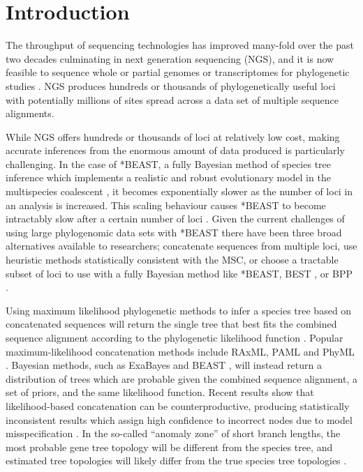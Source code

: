 \documentclass[nogrid]{MBE}%
\begin{document}

\maketitle
\clearpage

\section{Introduction}

The throughput of sequencing technologies has improved many-fold over the past
two decades culminating in next generation sequencing (NGS), and it is now
feasible to sequence whole or partial genomes or transcriptomes for phylogenetic
studies \citep{annurev-ecolsys-110512-135822}. NGS produces hundreds or
thousands of phylogenetically useful loci \citep[see for example][]{Blom20160181}
with potentially millions of sites spread across a data set of multiple
sequence alignments.

While NGS offers hundreds or thousands of loci at relatively low cost, making
accurate inferences from the enormous amount of data produced is particularly
challenging. In the case of *BEAST, a fully Bayesian method of species tree
inference which implements a realistic and robust evolutionary model in the
multispecies coalescent \citep[MSC;][]{Degnan2009332, Heled01032010}, it becomes exponentially
slower as the number of loci in an analysis is increased. This scaling behaviour
causes *BEAST to become intractably slow after a certain number of loci
\citep[the exact number will depend on other parameters of the data set, see][]{Ogilvie01052016}.
Given the current challenges of using large phylogenomic data sets with *BEAST
there have been three broad alternatives available to researchers; concatenate
sequences from multiple loci, use heuristic methods statistically consistent with the MSC, or choose a tractable
subset of loci to use with a fully Bayesian method like *BEAST, BEST \citep{Liu01112008}, or BPP
\citep{Yang854}.

Using maximum likelihood phylogenetic methods to infer a species tree based on concatenated
sequences will return the single tree that
best fits the combined sequence alignment according to the phylogenetic likelihood function \citep{Felsenstein1981}. Popular maximum-likelihood concatenation methods include
RAxML, PAML and PhyML \citep{Stamatakis01052014,
Yang01082007,Guindon01052010}. Bayesian methods, such as ExaBayes and BEAST
\citep{Aberer01102014, Drummond2007}, will instead return a distribution of trees which are probable
given the combined sequence alignment, a set of priors, and the same likelihood function.
Recent results show that likelihood-based concatenation
can be counterproductive, producing statistically inconsistent results which assign
high confidence to incorrect nodes due to model misspecification
\citep{NYAS:NYAS12747}. In the so-called ``anomaly zone'' of short branch
lengths, the most probable gene tree topology will be different from the species
tree, and estimated tree topologies will likely differ from the true species
tree topologies \citep{journal.pgen.0020068, Kubatko01022007}.
\end{document}
